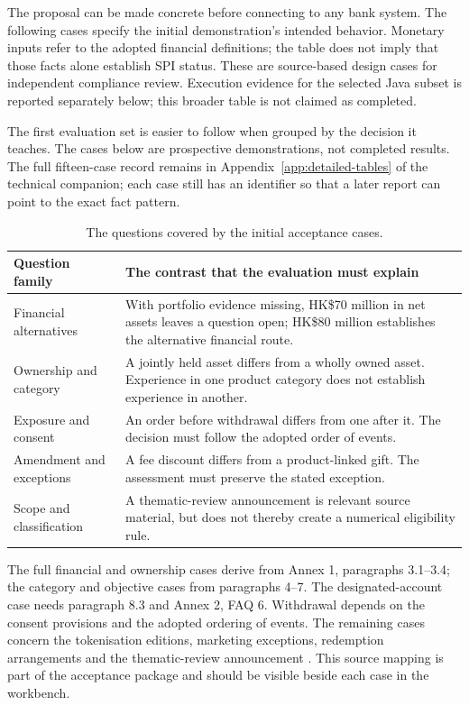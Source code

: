 \label{sec:evidence}

The proposal can be made concrete before connecting to any bank system. The
following cases specify the initial demonstration's intended behavior. Monetary
inputs refer to the adopted financial definitions; the table does not imply that
those facts alone establish SPI status. These are source-based design cases for
independent compliance review. Execution evidence for the selected Java subset
is reported separately below; this broader table is not claimed as completed.

The first evaluation set is easier to follow when grouped by the decision it
teaches. The cases below are prospective demonstrations, not completed results.
The full fifteen-case record remains in Appendix~\ref{app:detailed-tables} of the technical companion; each
case still has an identifier so that a later report can point to the exact fact
pattern.

\begin{table}[H]
\centering
\caption{The questions covered by the initial acceptance cases.}
\label{tab:cases}
\begin{tabularx}{\textwidth}{P{45mm}Y}
\toprule
Question family & The contrast that the evaluation must explain\\
\midrule
Financial alternatives & With portfolio evidence missing, HK\$70 million in net assets leaves a question open; HK\$80 million establishes the alternative financial route.\\
\addlinespace[0.5em]
Ownership and category & A jointly held asset differs from a wholly owned asset. Experience in one product category does not establish experience in another.\\
\addlinespace[0.5em]
Exposure and consent & An order before withdrawal differs from one after it. The decision must follow the adopted order of events.\\
\addlinespace[0.5em]
Amendment and exceptions & A fee discount differs from a product-linked gift. The assessment must preserve the stated exception.\\
\addlinespace[0.5em]
Scope and classification & A thematic-review announcement is relevant source material, but does not thereby create a numerical eligibility rule.\\
\bottomrule
\end{tabularx}
\end{table}


The full financial and ownership cases derive from Annex 1, paragraphs 3.1--3.4;
the category and objective cases from paragraphs 4--7. The designated-account
case needs paragraph 8.3 and Annex 2, FAQ 6. Withdrawal depends on the consent
provisions and the adopted ordering of events. The remaining cases concern the
tokenisation editions, marketing exceptions, redemption arrangements and the
thematic-review announcement
\citep{sfcspiannex1,sfcspiannex2,sfctoken2023,sfctoken2026,sfcmarketing,sfcreview2025}.
This source mapping is part of the acceptance package and should be visible
beside each case in the workbench.

